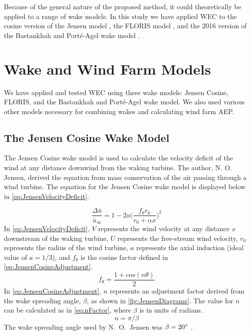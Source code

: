 \documentclass[a4paper]{jpconf}
\begin{document}
Because of the general nature of the proposed method, it could theoretically be applied to a range of wake models. In this study we have applied WEC to the cosine version of the Jensen model \cite{jensen1983}, the FLORIS model \cite{gebraad2014,thomas2017-Improving-FLORIS}, and the 2016 version of the Bastankhah and Port\'e-Agel wake model \cite{bastankhah2016}.

\section{Wake and Wind Farm Models}
We have applied and tested WEC using three wake models: Jensen Cosine, FLORIS, and the Bastankhah and Port\'e-Agel wake model. We also used various other models necessary for combining wakes and calculating wind farm AEP.

\subsection{The Jensen Cosine Wake Model}
The Jensen Cosine wake model is used to calculate the velocity deficit of the wind at any distance downwind from the waking turbine. The author, N. O. Jensen, derived the equation from mass conservation of the air passing through a wind turbine. The equation for the Jensen Cosine wake model is displayed below in \cref{eq:JensenVelocityDeficit}.

\begin{equation}
    \frac{\Delta \bar{u}}{\bar{u}_\infty} = 1 - 2a \bigg(\frac{f_\theta r_0}{r_0 + \alpha x} \bigg)^2
    \label{eq:JensenVelocityDeficit}
\end{equation}
%
In \cref{eq:JensenVelocityDeficit}, $V$ represents the wind velocity at any distance $x$ downstream of the waking turbine, $U$ represents the free-stream wind velocity, $r_0$ represents the radius of the wind turbine, $a$ represents the axial induction (ideal value of $a = 1/3$), and $f_\theta$ is the cosine factor defined in \cref{eq:JensenCosineAdjustment}.
%
\begin{equation}
f_\theta = \frac{1 + cos(n\theta)}{2}
\label{eq:JensenCosineAdjustment}
\end{equation}
%
In \cref{eq:JensenCosineAdjustment}, $n$ represents an adjustment factor derived from the wake spreading angle, $\beta$, as shown in \cref{fig:JensenDiagrams}. The value for $n$ can be calculated as in \cref{eq:nFactor}, where $\beta$ is in units of radians.
%
\begin{equation}
n = \pi / \beta
\label{eq:nFactor}
\end{equation}
%
The wake spreading angle used by N.~O.~Jensen was $\beta = 20 \degree$  \cite{jensen1983}. 
\end{document}
